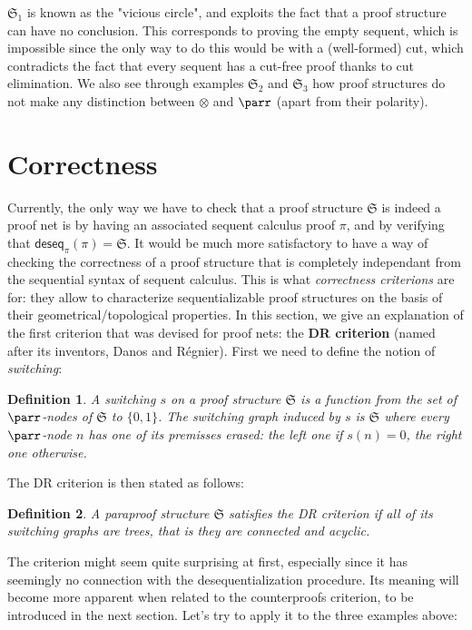 \documentclass[12pt]{report}
\newtheorem{definition}{Definition}
\begin{document}
$\mathfrak{S}_1$ is known as the "vicious circle", and exploits the fact that a proof structure can
have no conclusion. This corresponds to proving the empty sequent, which is impossible since the
only way to do this would be with a (well-formed) cut, which contradicts the fact that every sequent
has a cut-free proof thanks to cut elimination. We also see through examples $\mathfrak{S}_2$ and
$\mathfrak{S}_3$ how proof structures do not make any distinction between $\otimes$ and $\parr$
(apart from their polarity).

\section{Correctness}

Currently, the only way we have to check that a proof structure $\mathfrak{S}$ is indeed a proof net
is by having an associated sequent calculus proof $π$, and by verifying that
$\mathsf{deseq}_π(π) = \mathfrak{S}$. It would be much more satisfactory to have a way of
checking the correctness of a proof structure that is completely independant from the sequential
syntax of sequent calculus. This is what \emph{correctness criterions} are for: they allow to
characterize sequentializable proof structures on the basis of their geometrical/topological
properties. In this section, we give an explanation of the first criterion that was devised for
proof nets: the \textbf{DR criterion} (named after its inventors, Danos and Régnier). First we
need to define the notion of \emph{switching}:

\begin{definition}
    A \emph{switching} $s$ on a proof structure $\mathfrak{S}$ is a function from the set of
    $\parr$-nodes of $\mathfrak{S}$ to $\{0,1\}$. The \emph{switching graph} induced by $s$ is
    $\mathfrak{S}$ where every $\parr$-node $n$ has one of its premisses erased: the left one if
    $s(n) = 0$, the right one otherwise.
\end{definition}

The DR criterion is then stated as follows:

\begin{definition}
    A paraproof structure $\mathfrak{S}$ satisfies the DR criterion if all of its switching graphs
    are trees, that is they are connected and acyclic.
\end{definition}

The criterion might seem quite surprising at first, especially since it has seemingly no connection
with the desequentialization procedure. Its meaning will become more apparent when related to the
counterproofs criterion, to be introduced in the next section. Let's try to apply it to the three
examples above:
\end{document}
